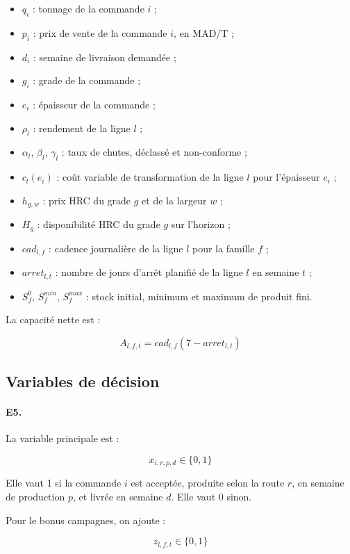\documentclass[12pt,a4paper]{article}
\newcommand{\question}[1]{\paragraph{\textcolor{blue!50!black}{#1.}}}
\begin{document}
\begin{itemize}
    \item $q_i$ : tonnage de la commande $i$ ;
    \item $p_i$ : prix de vente de la commande $i$, en MAD/T ;
    \item $d_i$ : semaine de livraison demandée ;
    \item $g_i$ : grade de la commande ;
    \item $e_i$ : épaisseur de la commande ;
    \item $\rho_l$ : rendement de la ligne $l$ ;
    \item $\alpha_l$, $\beta_l$, $\gamma_l$ : taux de chutes, déclassé et non-conforme ;
    \item $c_l(e_i)$ : coût variable de transformation de la ligne $l$ pour l'épaisseur $e_i$ ;
    \item $h_{g,w}$ : prix HRC du grade $g$ et de la largeur $w$ ;
    \item $H_g$ : disponibilité HRC du grade $g$ sur l'horizon ;
    \item $cad_{l,f}$ : cadence journalière de la ligne $l$ pour la famille $f$ ;
    \item $arret_{l,t}$ : nombre de jours d'arrêt planifié de la ligne $l$ en semaine $t$ ;
    \item $S^0_f$, $S^{min}_f$, $S^{max}_f$ : stock initial, minimum et maximum de produit fini.
\end{itemize}

La capacité nette est :

\begin{equation}
A_{l,f,t} = cad_{l,f}\left(7 - arret_{l,t}\right)
\end{equation}

\subsection{Variables de décision}

\question{E5}
La variable principale est :

\begin{equation}
x_{i,r,p,d} \in \{0,1\}
\end{equation}

Elle vaut 1 si la commande $i$ est acceptée, produite selon la route $r$, en semaine de production $p$, et livrée en semaine $d$. Elle vaut 0 sinon.

Pour le bonus campagnes, on ajoute :

\begin{equation}
z_{l,f,t} \in \{0,1\}
\end{equation}
\end{document}
